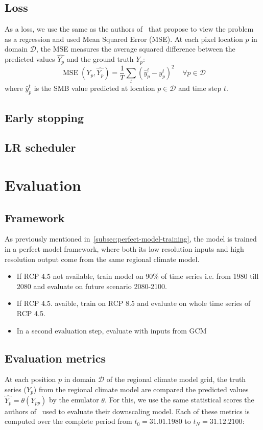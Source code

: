 \documentclass[a4paper,11pt,oneside]{report}
\begin{document}
\subsection{Loss}\label{subsec:loss}
As a loss, we use the same as the authors of~\cite{Doury} that propose to view the problem as a regression and used Mean Squared Error (MSE). At each pixel location $p$ in domain $\mathcal{D}$, the MSE measures the average squared difference between the predicted values $\widehat{Y_{p}}$ and the ground truth $Y_{p}$:
\begin{equation}
        \operatorname{MSE}\left(Y_{p},\widehat{Y_{p}}\right) = \frac{1}{T}\sum_{t}(\hat{y}_{p}^{t}-y^{t}_{p})^2   \;\;\;\; \forall p \in \mathcal{D} 
\end{equation}
where $\hat{y}_{p}^{t}$ is the SMB value predicted at location $p\in \mathcal{D} $ and time step $t$.

\subsection{Early stopping}
\subsection{LR scheduler}


\section{Evaluation}\label{sec:evaluation}

\subsection{Framework}\label{subsec:evaluation-framework}
As previously mentioned in~\ref{subsec:perfect-model-training}, the model is trained in a perfect model framework, where both its low resolution inputs and high resolution output come from the same regional climate model.
\begin{itemize}
\item If RCP 4.5 not available, train model on 90\% of time series i.e. from 1980 till 2080 and evaluate on future scenario 2080-2100. 
    \item If RCP 4.5. avaible, train on RCP 8.5 and evaluate on whole time series of RCP 4.5.
    \item In a second evaluation step, evaluate with inputs from GCM 
\end{itemize}


\subsection{Evaluation metrics}\label{subsec:evaluation-metrics}
At each position $p$ in domain $\mathcal{D} $ of the regional climate model grid, the truth series ($Y_{p}$) from the regional climate model are compared the predicted values $\widehat{Y_{p}}= \theta(Y_{pp})$ by the emulator $\theta$. For this, we use the same statistical scores the authors of~\cite{Doury} used to evaluate their downscaling model. Each of these metrics is computed over the complete period from $t_{0}=31.01.1980$ to $t_{N}=31.12.2100$:
\end{document}
